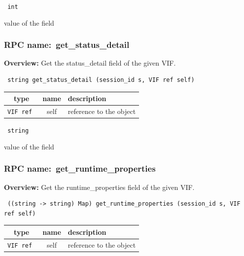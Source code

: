 \vspace{0.3cm}

{\tt 
int
}


value of the field
\vspace{0.3cm}
\vspace{0.3cm}
\vspace{0.3cm}
\subsubsection{RPC name:~get\_status\_detail}

{\bf Overview:} 
Get the status\_detail field of the given VIF.

\begin{verbatim} string get_status_detail (session_id s, VIF ref self)\end{verbatim}



 
\vspace{0.3cm}
\begin{tabular}{|c|c|p{7cm}|}
 \hline
{\bf type} & {\bf name} & {\bf description} \\ \hline
{\tt VIF ref } & self & reference to the object \\ \hline 

\end{tabular}

\vspace{0.3cm}

{\tt 
string
}


value of the field
\vspace{0.3cm}
\vspace{0.3cm}
\vspace{0.3cm}
\subsubsection{RPC name:~get\_runtime\_properties}

{\bf Overview:} 
Get the runtime\_properties field of the given VIF.

\begin{verbatim} ((string -> string) Map) get_runtime_properties (session_id s, VIF ref self)\end{verbatim}



 
\vspace{0.3cm}
\begin{tabular}{|c|c|p{7cm}|}
 \hline
{\bf type} & {\bf name} & {\bf description} \\ \hline
{\tt VIF ref } & self & reference to the object \\ \hline 

\end{tabular}

